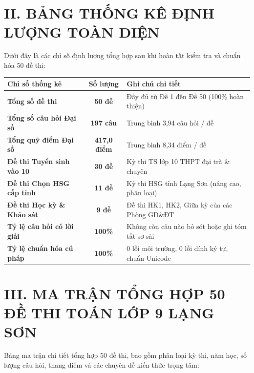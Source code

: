 \section*{II. BẢNG THỐNG KÊ ĐỊNH LƯỢNG TOÀN DIỆN}

Dưới đây là các chỉ số định lượng tổng hợp sau khi hoàn tất kiểm tra và chuẩn hóa 50 đề thi:

\begin{center}
\begin{tabular}{|l|c|l|}
\hline
\textbf{Chỉ số thống kê} & \textbf{Số lượng} & \textbf{Ghi chú chi tiết} \\ \hline
\textbf{Tổng số đề thi} & \textbf{50 đề} & Đầy đủ từ Đề 1 đến Đề 50 (100\% hoàn thiện) \\ \hline
\textbf{Tổng số câu hỏi Đại số} & \textbf{197 câu} & Trung bình 3,94 câu hỏi / đề \\ \hline
\textbf{Tổng quỹ điểm Đại số} & \textbf{417,0 điểm} & Trung bình 8,34 điểm / đề \\ \hline
\textbf{Đề thi Tuyển sinh vào 10} & \textbf{30 đề} & Kỳ thi TS lớp 10 THPT đại trà \& chuyên \\ \hline
\textbf{Đề thi Chọn HSG cấp tỉnh} & \textbf{11 đề} & Kỳ thi HSG tỉnh Lạng Sơn (nâng cao, phân loại) \\ \hline
\textbf{Đề thi Học kỳ \& Khảo sát} & \textbf{9 đề} & Đề thi HK1, HK2, Giữa kỳ của các Phòng GD\&ĐT \\ \hline
\textbf{Tỷ lệ câu hỏi có lời giải} & \textbf{100\%} & Không còn câu nào bỏ sót hoặc ghi tóm tắt sơ sài \\ \hline
\textbf{Tỷ lệ chuẩn hóa cú pháp} & \textbf{100\%} & 0 lỗi môi trường, 0 lỗi dính ký tự, chuẩn Unicode \\ \hline
\end{tabular}
\end{center}

\vspace{0.2cm}

\section*{III. MA TRẬN TỔNG HỢP 50 ĐỀ THI TOÁN LỚP 9 LẠNG SƠN}

Bảng ma trận chi tiết tổng hợp 50 đề thi, bao gồm phân loại kỳ thi, năm học, số lượng câu hỏi, thang điểm và các chuyên đề kiến thức trọng tâm:

